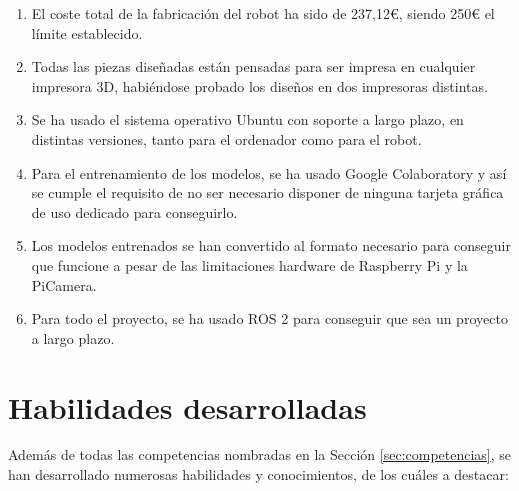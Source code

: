 \begin{enumerate}
	\item El coste total de la fabricación del robot ha sido de 237,12€, siendo 250€ el límite establecido.
	\item Todas las piezas diseñadas están pensadas para ser impresa en cualquier impresora 3D, habiéndose probado los diseños en dos impresoras distintas.
	\item Se ha usado el sistema operativo Ubuntu con soporte a largo plazo, en distintas versiones, tanto para el ordenador como para el robot.
	\item Para el entrenamiento de los modelos, se ha usado Google Colaboratory y así se cumple el requisito de no ser necesario disponer de ninguna tarjeta gráfica de uso dedicado para conseguirlo.
	\item Los modelos entrenados se han convertido al formato necesario para conseguir que funcione a pesar de las limitaciones hardware de Raspberry Pi y la PiCamera.
	\item Para todo el proyecto, se ha usado ROS 2 para conseguir que sea un proyecto a largo plazo.
\end{enumerate}

\section{Habilidades desarrolladas}

Además de todas las competencias nombradas en la Sección \ref{sec:competencias}, se han desarrollado numerosas habilidades y conocimientos, de los cuáles a destacar: 

